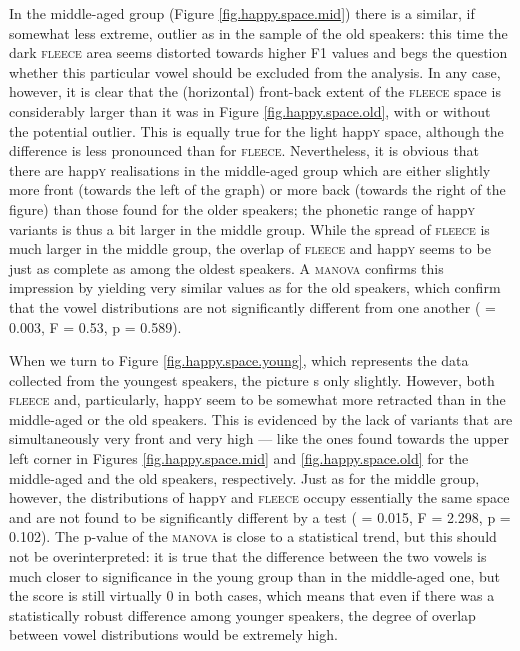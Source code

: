 In the middle-aged group (Figure \ref{fig.happy.space.mid}) there is a similar, if somewhat less extreme, outlier as in the sample of the old speakers: this time the dark \textsc{fleece} area seems distorted towards higher F1 values and begs the question whether this particular vowel should be excluded from the analysis.
In any case, however, it is clear that the (horizontal) front-back extent of the \textsc{fleece} space is considerably larger than it was in Figure \ref{fig.happy.space.old}, with or without the potential outlier.
This is equally true for the light happ\textsc{y} space, although the difference is less pronounced than for \textsc{fleece}.
Nevertheless, it is obvious that there are happ\textsc{y} realisations in the middle-aged group which are either slightly more front (towards the left of the graph) or more back (towards the right of the figure) than those found for the older speakers; the phonetic range of happ\textsc{y} variants is thus a bit larger in the middle group.
While the spread of \textsc{fleece} is much larger in the middle group, the overlap of \textsc{fleece} and happ\textsc{y} seems to be just as complete as among the oldest speakers.
A \textsc{manova} confirms this impression by yielding very similar values as for the old speakers, which confirm that the vowel distributions are not significantly different from one another ( = 0.003, F = 0.53, p = 0.589).

When we turn to Figure \ref{fig.happy.space.young}, which represents the data collected from the youngest speakers, the picture s only slightly.
However, both \textsc{fleece} and, particularly, happ\textsc{y} seem to be somewhat more retracted than in the middle-aged or the old speakers.
This is evidenced by the lack of variants that are simultaneously very front and very high --- like the ones found towards the upper left corner in Figures \ref{fig.happy.space.mid} and \ref{fig.happy.space.old} for the middle-aged and the old speakers, respectively.
Just as for the middle group, however, the distributions of happ\textsc{y} and \textsc{fleece} occupy essentially the same space and are not found to be significantly different by a  test ( = 0.015, F = 2.298, p = 0.102).
The p-value of the \textsc{manova} is close to a statistical trend, but this should not be overinterpreted: it is true that the difference between the two vowels is much closer to significance in the young group than in the middle-aged one, but the  score is still virtually 0 in both cases, which means that even if there was a statistically robust difference among younger speakers, the degree of overlap between vowel distributions would be extremely high.

